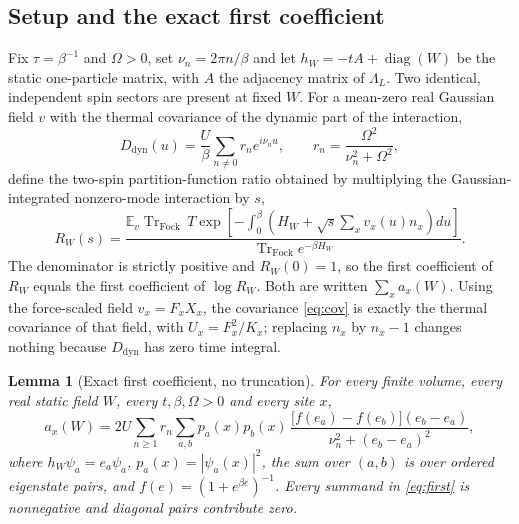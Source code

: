 \documentclass[11pt]{article}
\newtheorem{lemma}[theorem]{Lemma}
\theoremstyle{definition}
\theoremstyle{remark}
\DeclareMathOperator{\Tr}{Tr}
\DeclareMathOperator{\diag}{diag}
\newcommand{\E}{\mathbb{E}}
\begin{document}
\subsection{Setup and the exact first coefficient}

Fix $\tau=\beta^{-1}$ and $\Omega>0$, set $\nu_n=2\pi n/\beta$ and let
$h_W=-tA+\diag(W)$ be the static one-particle matrix, with $A$ the adjacency matrix of
$\Lambda_L$. Two identical, independent spin sectors are present at fixed $W$. For a
mean-zero real Gaussian field $v$ with the thermal covariance of the dynamic part of
the interaction,
\begin{equation}
D_{\mathrm{dyn}}(u)=\frac{U}{\beta}\sum_{n\ne0}r_n e^{i\nu_nu},\qquad
r_n=\frac{\Omega^2}{\nu_n^2+\Omega^2},
\label{eq:cov}
\end{equation}
define the two-spin partition-function ratio obtained by multiplying the
Gaussian-integrated nonzero-mode interaction by $s$,
\begin{equation}
R_W(s)=\frac{\E_v\Tr_{\mathrm{Fock}}\,T
\exp\!\left[-\int_0^\beta\!\left(H_W+\sqrt{s}\sum_xv_x(u)n_x\right)du\right]}
{\Tr_{\mathrm{Fock}}e^{-\beta H_W}} .
\label{eq:RW}
\end{equation}
The denominator is strictly positive and $R_W(0)=1$, so the first coefficient of
$R_W$ equals the first coefficient of $\log R_W$. Both are written
$\sum_xa_x(W)$. Using the force-scaled field $v_x=F_xX_x$, the covariance
\eqref{eq:cov} is exactly the thermal covariance of that field, with
$U_x=F_x^2/K_x$; replacing $n_x$ by $n_x-1$ changes nothing because $D_{\mathrm{dyn}}$
has zero time integral.

\begin{lemma}[Exact first coefficient, no truncation]
\label{lem:first}
For every finite volume, every real static field $W$, every $t,\beta,\Omega>0$ and
every site $x$,
\begin{equation}
a_x(W)=2U\sum_{n\ge1}r_n\sum_{a,b}p_a(x)p_b(x)\,
\frac{\bigl[f(e_a)-f(e_b)\bigr](e_b-e_a)}
{\nu_n^2+(e_b-e_a)^2},
\label{eq:first}
\end{equation}
where $h_W\psi_a=e_a\psi_a$, $p_a(x)=|\psi_a(x)|^2$, the sum over $(a,b)$ is over
ordered eigenstate pairs, and $f(e)=(1+e^{\beta e})^{-1}$. Every summand in
\eqref{eq:first} is nonnegative and diagonal pairs contribute zero.
\end{lemma}
\end{document}

